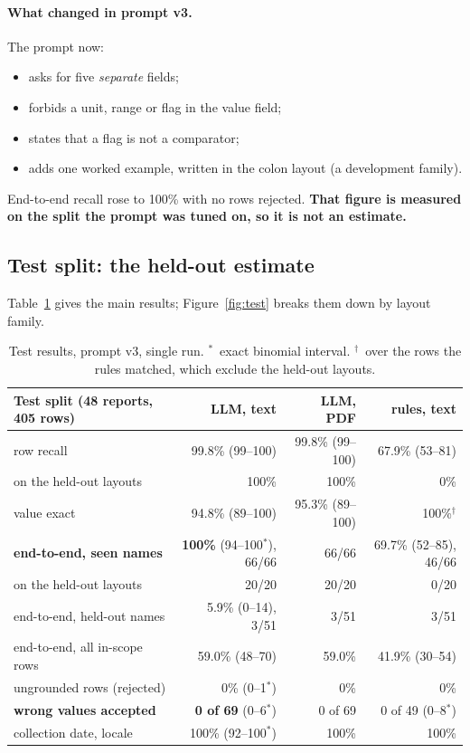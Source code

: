 \documentclass[11pt,a4paper]{article}
\begin{document}
\paragraph{What changed in prompt v3.} The prompt now:
\begin{itemize}[nosep]
  \item asks for five \emph{separate} fields;
  \item forbids a unit, range or flag in the value field;
  \item states that a flag is not a comparator;
  \item adds one worked example, written in the colon layout (a development family).
\end{itemize}
End-to-end recall rose to 100\% with no rows rejected. \textbf{That figure is measured on the split the prompt was tuned on, so it is not an estimate.}

\subsection{Test split: the held-out estimate}
Table~\ref{tab:test} gives the main results; Figure~\ref{fig:test} breaks them down by layout family.

\begin{table}[h]
\centering\footnotesize
\begin{tabular}{@{}lrrr@{}}
\toprule
Test split (48 reports, 405 rows) & LLM, text & LLM, PDF & rules, text \\
\midrule
row recall & 99.8\% (99--100) & 99.8\% (99--100) & 67.9\% (53--81) \\
\quad on the held-out layouts & 100\% & 100\% & 0\% \\
value exact & 94.8\% (89--100) & 95.3\% (89--100) & 100\%$^\dagger$ \\
\textbf{end-to-end, seen names} & \textbf{100\%} (94--100$^*$), 66/66 & 66/66 & 69.7\% (52--85), 46/66 \\
\quad on the held-out layouts & 20/20 & 20/20 & 0/20 \\
end-to-end, held-out names & 5.9\% (0--14), 3/51 & 3/51 & 3/51 \\
end-to-end, all in-scope rows & 59.0\% (48--70) & 59.0\% & 41.9\% (30--54) \\
ungrounded rows (rejected) & 0\% (0--1$^*$) & 0\% & 0\% \\
\textbf{wrong values accepted} & \textbf{0 of 69} (0--6$^*$) & 0 of 69 & 0 of 49 (0--8$^*$) \\
collection date, locale & 100\% (92--100$^*$) & 100\% & 100\% \\
\bottomrule
\end{tabular}
\caption{Test results, prompt v3, single run. $^*$~exact binomial interval. $^\dagger$~over the rows the rules matched, which exclude the held-out layouts.}
\label{tab:test}
\end{table}
\end{document}
